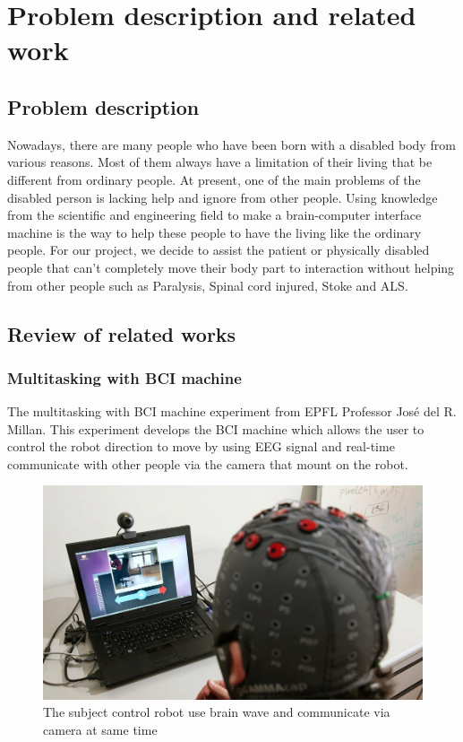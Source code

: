 \chapter{Problem description and related work}

\label{ch:Problem description and related work}

\setlength{\parindent}{4em}
\setlength{\parskip}{1em}
\renewcommand{\baselinestretch}{1.5}

\section{Problem description}
\hspace{1.5cm} Nowadays, there are many people who have been born with a disabled body from various reasons. Most of them always have a limitation of their living that be different from ordinary people. At present, one of the main problems of the disabled person is lacking help and ignore from other people. Using knowledge from the scientific and engineering field to make a brain-computer interface machine is the way to help these people to have the living like the ordinary people. For our project, we decide to assist the patient or physically disabled people that can't completely move their body part to interaction without helping from other people such as Paralysis, Spinal cord injured, Stoke and ALS.

\section{Review of related works}
\subsection {Multitasking with BCI machine\cite{ref1}}
\hspace{1.5cm} The multitasking with BCI machine experiment from EPFL Professor José del R. Millan. This experiment develops the BCI machine which allows the user to control the robot direction to move by using EEG signal and real-time communicate with other people via the camera that mount on the robot.
\begin{figure}[ht]
	\centering
  	\includegraphics[scale = 0.4]{chapter2/21.png}
  	\caption{The subject control robot use brain wave and communicate via camera at same time}
\end{figure}

